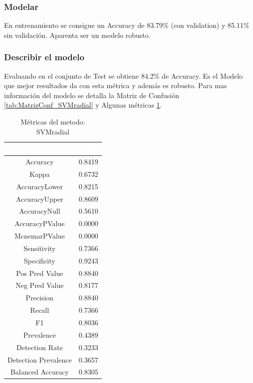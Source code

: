 \subsubsection{Modelar}

En entrenamiento se consigue un Accuracy de 83.79\% (con validation) y
85.11\% sin validación. Aparenta ser un modelo robusto.


\subsubsection{Describir el modelo}

Evaluando en el conjunto de Test se obtiene 84.2\% de Accuracy. Es el Modelo que mejor resultados da con esta métrica y además es robusto. Para mas información del modelo se detalla la Matriz de Confusión \ref{tab:MatrizConf_SVMradial} y Algunas métricas \ref{tab:metricas_SVMradial}.

\begin{table}[!h]
	
	\caption{\label{tab:metricas_SVMradial}Métricas del metodo: SVMradial }
	\centering
	\begin{tabular}[t]{cc}
		\toprule
		\rowcolor{black}  \multicolumn{1}{c}{\textcolor{white}{\textbf{metricas}}} & \multicolumn{1}{c}{\textcolor{white}{\textbf{valor}}}\\
		\midrule
		\rowcolor{gray!6}  Accuracy & 0.8419\\
		Kappa & 0.6732\\
		\rowcolor{gray!6}  AccuracyLower & 0.8215\\
		AccuracyUpper & 0.8609\\
		\rowcolor{gray!6}  AccuracyNull & 0.5610\\
		\addlinespace
		AccuracyPValue & 0.0000\\
		\rowcolor{gray!6}  McnemarPValue & 0.0000\\
		Sensitivity & 0.7366\\
		\rowcolor{gray!6}  Specificity & 0.9243\\
		Pos Pred Value & 0.8840\\
		\addlinespace
		\rowcolor{gray!6}  Neg Pred Value & 0.8177\\
		Precision & 0.8840\\
		\rowcolor{gray!6}  Recall & 0.7366\\
		F1 & 0.8036\\
		\rowcolor{gray!6}  Prevalence & 0.4389\\
		\addlinespace
		Detection Rate & 0.3233\\
		\rowcolor{gray!6}  Detection Prevalence & 0.3657\\
		Balanced Accuracy & 0.8305\\
		\bottomrule
	\end{tabular}
\end{table}


